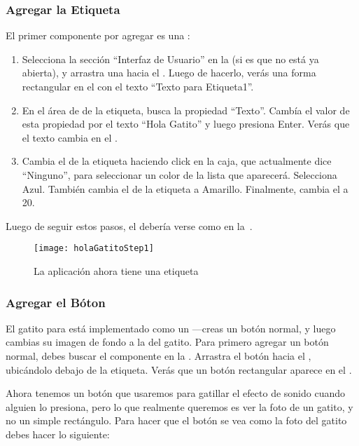 \subsubsection*{Agregar la Etiqueta}

El primer componente por agregar es una :

\begin{enumerate}

\item Selecciona la sección ``Interfaz de Usuario'' en la \palette (si
  es que no está ya abierta), y arrastra una 
  hacia el \viewer. Luego de hacerlo, verás una forma rectangular en
  el \viewer con el texto ``Texto para Etiqueta1''.

\item En el área de \properties de la etiqueta, busca la propiedad
  ``Texto''. Cambía el valor de esta propiedad por el texto ``Hola
  Gatito'' y luego presiona Enter. Verás que el texto cambia en el
  \viewer.

\item Cambia el \backgroundColor de la etiqueta haciendo click en la
  caja, que actualmente dice ``Ninguno'', para seleccionar un color de
  la lista que aparecerá. Selecciona Azul. También cambia el
  \textColor de la etiqueta a Amarillo. Finalmente, cambia el
  \fontSize a 20.

\end{enumerate}

Luego de seguir estos pasos, el \designer debería verse como en
la~.

\begin{figure}[H]
\centering
\texttt{[image: holaGatitoStep1]}
\caption{La aplicación ahora tiene una etiqueta}
\label{fig:holaGatitoStep1}
\end{figure}

\subsubsection*{Agregar el Bóton}
El gatito para  está implementado como un
---creas un botón normal, y luego cambias su imagen
de fondo a la del gatito. Para primero agregar un botón normal, debes
buscar el componente  en la \palette. Arrastra el
botón hacia el \viewer, ubicándolo debajo de la etiqueta. Verás que un
botón rectangular aparece en el \viewer.

Ahora tenemos un botón que usaremos para gatillar el efecto de sonido
cuando alguien lo presiona, pero lo que realmente queremos es ver la
foto de un gatito, y no un simple rectángulo. Para hacer que el botón
se vea como la foto del gatito debes hacer lo siguiente:

